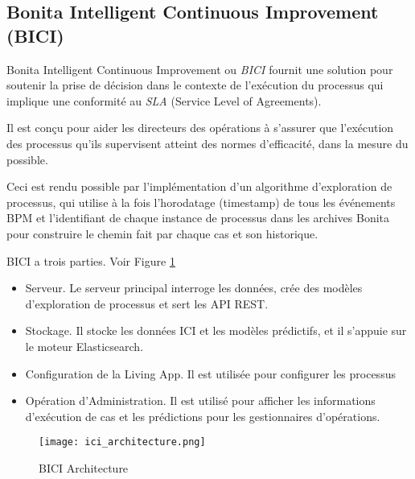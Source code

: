 \subsection{Bonita Intelligent Continuous Improvement (BICI)}


Bonita Intelligent Continuous Improvement ou \emph{BICI} fournit une solution pour soutenir la prise de décision dans le contexte de l'exécution du processus qui implique une conformité au \textit{SLA} (Service Level of Agreements).

Il est conçu pour aider les directeurs des opérations à s'assurer que l'exécution des processus qu'ils supervisent atteint des normes d'efficacité, dans la mesure du possible.

Ceci est rendu possible par l'implémentation d'un algorithme d'exploration de processus, qui utilise à la fois l’horodatage (timestamp) de tous les événements BPM et l'identifiant de chaque instance de processus dans les archives Bonita pour construire le chemin fait par chaque cas et son historique.

BICI a trois parties. Voir Figure \ref{fig:ici_architecture}
\begin{itemize}
  \item Serveur. Le serveur principal interroge les données, crée des modèles d'exploration de processus et sert les API REST.
  \item Stockage. Il stocke les données ICI et les modèles prédictifs, et il s'appuie sur le moteur Elasticsearch.
  \item Configuration de la Living App. Il est utilisée pour configurer les processus
  \item Opération d'Administration. Il est utilisé pour afficher les informations d'exécution de cas et les prédictions pour les gestionnaires d'opérations.
\end{itemize}

\begin{figure}[!ht]
\centering
\texttt{[image: ici\_architecture.png]}
\caption{BICI Architecture}
\label{fig:ici_architecture}
\end{figure}
